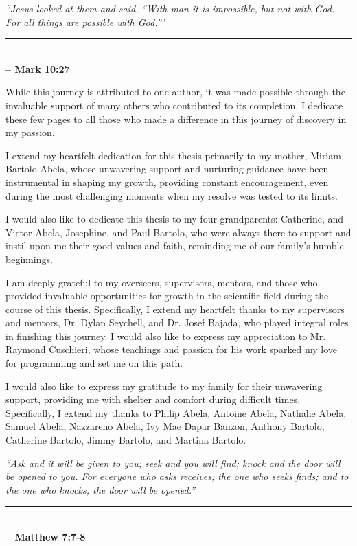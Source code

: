 \vspace{0.4\textheight}

\normalsize
\noindent
\textit{``Jesus looked at them and said, ``With man it is impossible, but not with God. For all things are possible with God.'''} \\[1ex] \noindent
\rule{\textwidth}{1pt} \\[1ex]
\hfill \textbf{-- Mark 10:27}



\newpage

While this journey is attributed to one author, it was made possible through the invaluable support of many others who contributed to its completion. I dedicate these few pages to all those who made a difference in this journey of discovery in my passion.

\bigskip

I extend my heartfelt dedication for this thesis primarily to my mother, Miriam Bartolo Abela, whose unwavering support and nurturing guidance have been instrumental in shaping my growth, providing constant encouragement, even during the most challenging moments when my resolve was tested to its limits.

\bigskip

I would also like to dedicate this thesis to my four grandparents: Catherine, and Victor Abela, Josephine, and Paul Bartolo, who were always there to support and instil upon me their good values and faith, reminding me of our family's humble beginnings.

\bigskip

I am deeply grateful to my overseers, supervisors, mentors, and those who provided invaluable opportunities for growth in the scientific field during the course of this thesis. Specifically, I extend my heartfelt thanks to my supervisors and mentors, Dr. Dylan Seychell, and Dr. Josef Bajada, who played integral roles in finishing this journey. I would also like to express my appreciation to Mr. Raymond Cuschieri, whose teachings and passion for his work sparked my love for programming and set me on this path.

\bigskip

I would also like to express my gratitude to my family for their unwavering support, providing me with shelter and comfort during difficult times. Specifically, I extend my thanks to Philip Abela, Antoine Abela, Nathalie Abela, Samuel Abela, Nazzareno Abela, Ivy Mae Dapar Banzon, Anthony Bartolo, Catherine Bartolo, Jimmy Bartolo, and Martina Bartolo.

\bigskip
\bigskip
\bigskip
\bigskip
\bigskip
\bigskip
\bigskip
\bigskip


\noindent
\textit{``Ask and it will be given to you; seek and you will find; knock and the door will be opened to you. For everyone who asks receives; the one who seeks finds; and to the one who knocks, the door will be opened.''}\\[1ex] \noindent
\rule{\textwidth}{1pt} \\[1ex]
\hfill \textbf{-- Matthew 7:7-8}

